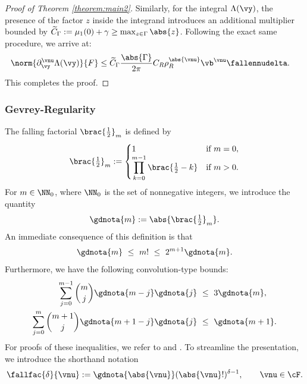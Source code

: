 \begin{proof}[Proof of Theorem \ref{theorem:main2}]
	Similarly, for the integral $\Lambda(\vy)$, the presence of the factor $z$ inside the integrand introduces an additional multiplier bounded by $\widetilde C_\Gamma := \mu_1(0) + \gamma \geq  \max_{z \in \Gamma} \abs{z} $. Following the exact same procedure, we arrive at:
	\begin{align*}
		\norm{\partial_{\vy}^{\vnu} \Lambda(\vy)}{F}
		&\leq \widetilde C_\Gamma  \frac{\abs{\Gamma}}{2\pi}C_R \rho_R^{\abs{\vnu}} \vb^\vnu \fallennudelta.
	\end{align*}
	This completes the proof.
\end{proof}

\subsubsection{Gevrey-Regularity}
The falling factorial $\brac{\tfrac{1}{2}}_m$ is defined by
\begin{equation*}
	\brac{\tfrac{1}{2}}_m
	:=
	\begin{cases}
		1 \quad & \text{if } m=0, \\
		\displaystyle \prod_{{k=0}}^{m-1} \brac{\tfrac{1}{2} - k}& \text{if } m > 0. 
	\end{cases}	
\end{equation*}	
For $m \in \NN_0$, where $\NN_0$ is the set of nonnegative integers, we introduce the quantity
\begin{equation*}
	\gdnota{m} := \abs{\brac{\tfrac{1}{2}}_m}.
\end{equation*}	
An immediate consequence of this definition is that
\begin{equation} \label{ineq: ffac_m}
	\gdnota{m}
	\ \le \ m!
	\ \le \ 
	2^{m+1} \gdnota{m}.
\end{equation}	
Furthermore, we have the following convolution-type bounds:
\begin{subequations}\label{ineq: sum-ffac a}
\begin{align} 
	\sum_{j=0}^{m-1}\binom{m}{j}\gdnota{m-j}\gdnota{j} \ &\le \  3 \gdnota{m}, \label{ineq: sum-ffac}\\
	\sum_{j=0}^{m}\binom{m+1}{j}\gdnota{m+1-j}\gdnota{j} \ &\le \  \gdnota{m+1}. \label{ineq: sum-ffac 2}
\end{align}	
\end{subequations}
For proofs of these inequalities, we refer to \cite[Lemma 2.3]{CL2024} and \cite[Lemma 2.1]{CL2024b}.
	To streamline the presentation, we introduce the shorthand notation
	\begin{equation*}
		\fallfac{\delta}{\vnu} :=  \gdnota{\abs{\vnu}}  (\abs{\vnu}!)^{\delta-1}, {\qquad \vnu \in \cF.}
	\end{equation*}
